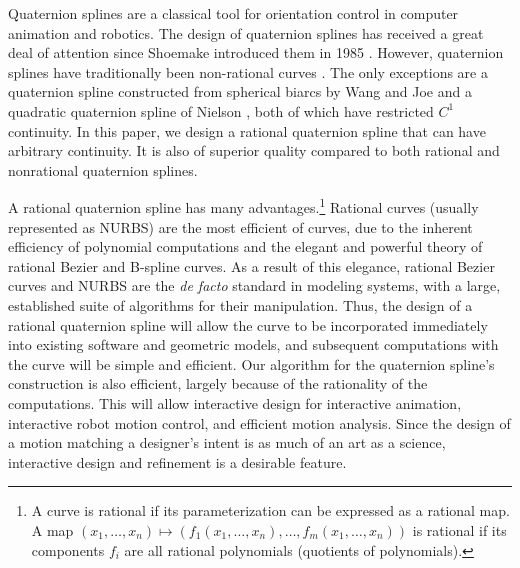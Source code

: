 Quaternion splines are a classical tool for orientation control in computer
animation and robotics.
The design of quaternion splines has received a great deal
of attention since Shoemake introduced them in 1985 \cite{shoemake85}.
However, quaternion splines have traditionally been non-rational curves 
\cite{shoemake85,duff85,pletinckx89,schlag91,barr92,nielson92,nielson93,nam95,park95,kim95,rama97}.
The only exceptions are a quaternion spline constructed
from spherical biarcs by Wang and Joe \cite{wang93}
and a quadratic quaternion spline of Nielson \cite{nielson92,nielson93},
both of which have restricted $C^1$ continuity.
In this paper, we design a rational quaternion spline that can have
arbitrary continuity.
It is also of superior quality compared to both rational and nonrational
quaternion splines.

A rational quaternion spline has many advantages.\footnote{A 
	curve is rational if its parameterization can be 
	expressed as a rational map.
	A map $(x_1,\ldots,x_n) \mapsto (f_1 (x_1,\ldots,x_n),\ldots,f_m (x_1,\ldots,x_n))$
	is rational if its components $f_i$ are all rational polynomials
	(quotients of polynomials).}
Rational curves (usually represented as NURBS)
are the most efficient of curves,
due to the inherent efficiency of polynomial computations and 
the elegant and powerful theory of rational Bezier and B-spline curves.
As a result of this elegance,
rational Bezier curves and NURBS are the {\em de facto} standard 
in modeling systems, with a large, established suite of algorithms for their 
manipulation.
Thus, the design of a rational quaternion spline will allow the 
curve to be incorporated immediately into existing software and 
geometric models, 
and subsequent computations with the curve will be simple and efficient.
Our algorithm for the quaternion spline's construction is also efficient, 
largely because of the rationality of the computations.
This will allow interactive design for interactive animation, 
interactive robot motion control, and efficient motion analysis.
Since the design of a motion matching a designer's intent 
is as much of an art as a science,
interactive design and refinement is a desirable feature.

